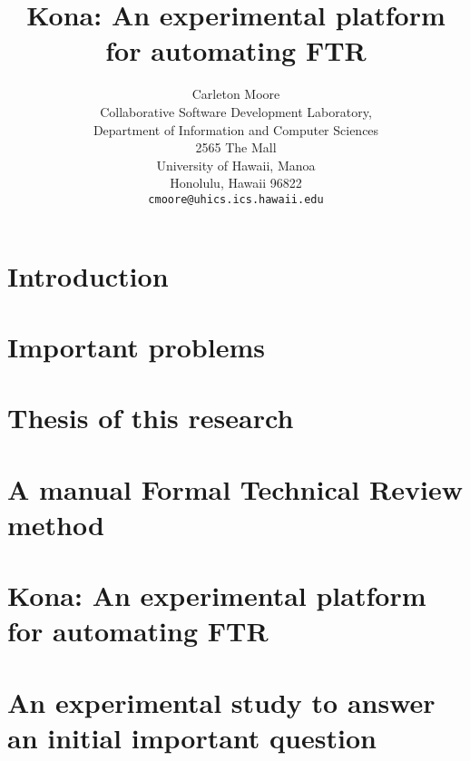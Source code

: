 




\title{Kona:   An experimental platform for automating FTR}
\author{Carleton Moore\\
Collaborative Software Development Laboratory,\\
Department of Information and Computer Sciences\\
2565 The Mall\\
University of Hawaii, Manoa\\
Honolulu, Hawaii   96822\\
{\tt cmoore@uhics.ics.hawaii.edu}}
\maketitle

\tableofcontents

\chapter{Introduction}
\chapter{Important problems}
\chapter{Thesis of this research}
\chapter{A manual Formal Technical Review method}
\chapter{Kona:  An experimental platform for automating FTR}
\chapter{An experimental study to answer an initial important question}
